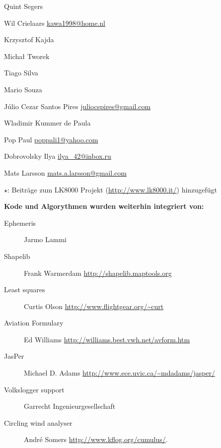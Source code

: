 \begin{compactitem}
\item Quint Segers
\item Wil Crielaars \url{kawa1998@home.nl}
\item Krzysztof Kajda
\item Micha\l{}   Tworek %
\item Tiago Silva
\item Mario Souza
\item J\'ulio Cezar Santos Pires \url{juliocspires@gmail.com}
\item Wladimir Kummer de Paula
\item Pop Paul \url{poppali1@yahoo.com}
\item Dobrovolsky Ilya \url{ilya_42@inbox.ru}
\item Mats Larsson \url{mats.a.larsson@gmail.com}
\end{compactitem}

$\star$:  Beiträge zum  LK8000 Projekt (\url{http://www.lk8000.it/}) hinzugefügt

\vspace{1em}
{\large\bf Kode und Algorythmen wurden weiterhin integriert von:}
\begin{description}
\item[Ephemeris] Jarmo Lammi
\item[Shapelib] Frank Warmerdam \url{http://shapelib.maptools.org}
\item[Least squares] Curtis Olson \url{http://www.flightgear.org/~curt}
\item[Aviation Formulary] Ed Williams \url{http://williams.best.vwh.net/avform.htm}
\item[JasPer] Michael D. Adams \url{http://www.ece.uvic.ca/~mdadams/jasper/}
\item[Volkslogger support] Garrecht Ingenieurgesellschaft
\item[Circling wind analyser] Andr\'e Somers \url{http://www.kflog.org/cumulus/}.
\end{description}
